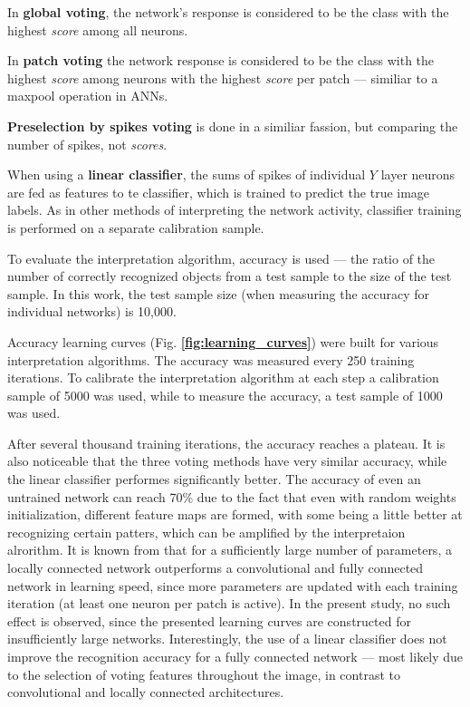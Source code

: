 \documentclass[a4paper,10pt]{article}
\newcommand{\refbf}[1]{\textbf{\ref{#1}}}
\begin{document}
In \textbf{global voting}, the network's response is considered to be the class with the highest \textit{score} among all neurons.

In \textbf{patch voting} the network response is considered to be the class with the highest \textit{score} among neurons with the highest \textit{score} per patch --- similiar to a maxpool operation in ANNs.

\textbf{Preselection by spikes voting} is done in a similiar fassion, but comparing the number of spikes, not \textit{scores}.

When using a \textbf{linear classifier}, the sums of spikes of individual  $Y$ layer neurons are fed as features to te classifier, which is trained to predict the true image labels. As in other methods of interpreting the network activity, classifier training is performed on a separate calibration sample.

To evaluate the interpretation algorithm, accuracy is used --- the ratio of the number of correctly recognized objects from a test sample to the size of the test sample. In this work, the test sample size (when measuring the accuracy for individual networks) is 10,000.

Accuracy learning curves (Fig. \refbf{fig:learning_curves}) were built for various interpretation algorithms. The accuracy was measured every 250 training iterations. To calibrate the interpretation algorithm at each step a calibration sample of 5000 was used, while to measure the accuracy, a test sample of 1000 was used.

After several thousand training iterations, the accuracy reaches a plateau. It is also noticeable that the three voting methods have very similar accuracy, while the linear classifier performes significantly better. The accuracy of even an untrained network can reach 70\% due to the fact that even with random weights initialization, different feature maps are formed, with some being a little better at recognizing certain patters, which can be amplified by the interpretaion alrorithm. It is known from \parencite{saunders2019locally} that for a sufficiently large number of parameters, a locally connected network outperforms a convolutional and fully connected network in learning speed, since more parameters are updated with each training iteration (at least one neuron per patch is active). In the present study, no such effect is observed, since the presented learning curves are constructed for insufficiently large networks. Interestingly, the use of a linear classifier does not improve the recognition accuracy for a fully connected network --- most likely due to the selection of voting features throughout the image, in contrast to convolutional and locally connected architectures.
\end{document}
